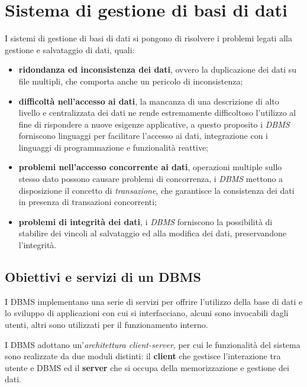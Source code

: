 \section{Sistema di gestione di basi di dati}%
\label{sec:Sistema di gestione di basi di dati}
I sistemi di gestione di basi di dati si pongono di risolvere i problemi legati
alla gestione e salvataggio di dati, quali:
\begin{itemize}
  \item \textbf{ridondanza ed inconsistenza dei dati}, ovvero la duplicazione
    dei dati su file multipli, che comporta anche un pericolo di inconsistenza;
  \item \textbf{difficoltà nell'accesso ai dati}, la mancanza di una descrizione
    di alto livello e centralizzata dei dati ne rende estremamente difficoltoso
    l'utilizzo al fine di rispondere a nuove esigenze applicative, a questo
    proposito i \emph{DBMS} forniscono linguaggi per facilitare l'accesso ai
    dati, integrazione con i linguaggi di programmazione e funzionalità
    reattive;
  \item \textbf{problemi nell'accesso concorrente ai dati}, operazioni multiple
    sullo stesso dato possono causare problemi di concorrenza, i \emph{DBMS}
    mettono a disposizione il concetto di \textit{transazione}, che garantisce
    la consistenza dei dati in presenza di transazioni concorrenti;
  \item \textbf{problemi di integrità dei dati}, i \emph{DBMS} forniscono la
    possibilità di stabilire dei vincoli al salvataggio ed alla modifica dei
    dati, preservandone l'integrità.
\end{itemize}

\subsection{Obiettivi e servizi di un DBMS}%
\label{sub:Obiettivi e servizi di un DBMS}
I DBMS implementano una serie di servizi per offrire l'utilizzo della base di
dati e lo sviluppo di applicazioni con cui si interfacciano, alcuni sono
invocabili dagli utenti, altri sono utilizzati per il funzionamento interno.

I DBMS adottano un'\textit{architettura client-server}, per cui le funzionalità
del sistema sono realizzate da due moduli distinti: il \textbf{client} che
gestisce l'interazione tra utente e DBMS ed il \textbf{server} che si occupa
della memorizzazione e gestione dei dati.

